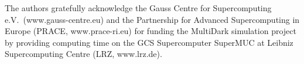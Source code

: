 \documentclass[twocolumn,apj,iop,tighten]{emulateapj2}
\begin{document}
The authors gratefully acknowledge the Gauss Centre for Supercomputing e.V.\ (www.gauss-centre.eu) and the Partnership for Advanced Supercomputing in Europe (PRACE, www.prace-ri.eu) for funding the MultiDark simulation project by providing computing time on the GCS Supercomputer SuperMUC at Leibniz Supercomputing Centre (LRZ, www.lrz.de).


\end{document}
